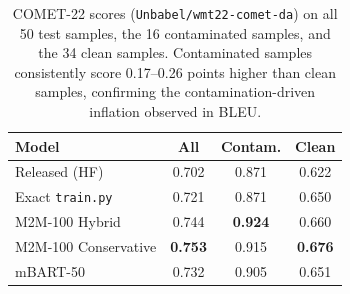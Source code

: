 
\begin{table}[t]
\centering
\small
\begin{tabular}{@{}lccc@{}}
\toprule
\textbf{Model} & \textbf{All} & \textbf{Contam.} & \textbf{Clean} \\
\midrule
Released (HF)         & 0.702 & 0.871 & 0.622 \\
Exact \texttt{train.py} & 0.721 & 0.871 & 0.650 \\
M2M-100 Hybrid        & 0.744 & \textbf{0.924} & 0.660 \\
M2M-100 Conservative       & \textbf{0.753} & 0.915 & \textbf{0.676} \\
mBART-50              & 0.732 & 0.905 & 0.651 \\
\bottomrule
\end{tabular}
\caption{COMET-22 scores (\texttt{Unbabel/wmt22-comet-da}) on all 50 test samples, the 16 contaminated samples, and the 34 clean samples. Contaminated samples consistently score 0.17--0.26 points higher than clean samples, confirming the contamination-driven inflation observed in BLEU.}
\label{tab:comet22}
\end{table}
